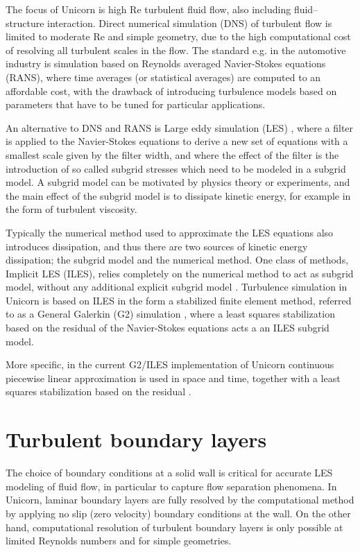 The focus of Unicorn is high Re turbulent fluid flow, also including fluid--structure interaction. Direct numerical simulation (DNS) of turbulent flow is limited to moderate Re and simple geometry, due to the high computational cost of resolving all turbulent scales in the flow. The standard e.g. in the automotive industry is simulation based on Reynolds averaged Navier-Stokes equations (RANS), where time averages (or statistical averages) are computed to an affordable cost, with the drawback of introducing turbulence models based on parameters that have to be tuned for particular applications.

An alternative to DNS and RANS is Large eddy simulation (LES) \cite{Sagaut2005}, where a filter is applied to the Navier-Stokes equations to derive a new set of equations with a smallest scale given by the filter width, and where the effect of the filter is the introduction of so called subgrid stresses which need to be modeled in a subgrid model. A subgrid model can be motivated by physics theory or experiments, and the main effect of the subgrid model is to dissipate kinetic energy, for example in the form of turbulent viscosity.

Typically the numerical method used to approximate the LES equations also introduces dissipation, and thus there are two sources of kinetic energy dissipation; the subgrid model and the numerical method. One class of methods, Implicit LES (ILES), relies completely on the numerical method to act as subgrid model, without any additional explicit subgrid model \cite{Sagaut2005}. Turbulence simulation in Unicorn is based on ILES in the form a stabilized finite element method, referred to as a General Galerkin (G2) simulation \cite{HoffmanJohnson2007}, where a least squares stabilization based on the residual of the Navier-Stokes equations acts a an ILES subgrid model.

More specific, in the current G2/ILES implementation of Unicorn continuous piecewise linear approximation is used in space and time, together with a least squares stabilization based on the residual \cite{HoffmanJohnson2007}.

\section{Turbulent boundary layers}
\label{section:blayer}

The choice of boundary conditions at a solid wall is critical for accurate LES modeling of fluid flow, in particular to capture flow separation phenomena. In Unicorn, laminar boundary layers are fully resolved by the computational method by applying no slip (zero velocity) boundary conditions at the wall. On the other hand, computational resolution of turbulent boundary layers is only possible at limited Reynolds numbers and for simple geometries.

